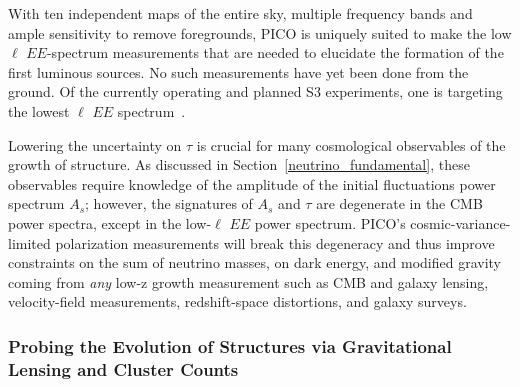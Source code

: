 \documentclass[PICOReport.tex]{subfiles}
\begin{document}
With ten independent maps of the entire sky, multiple frequency bands and ample sensitivity to remove foregrounds, PICO is uniquely suited to make the low $\ell$ $EE$-spectrum measurements that are needed to elucidate the formation of the first luminous sources. No such measurements have yet been done from the ground. Of the currently operating and planned S3 experiments, one is targeting the lowest $\ell$ $EE$ spectrum~\citep{class_overview}. 

Lowering the uncertainty on $\tau$ is crucial for many cosmological observables of the growth of structure. As discussed in Section~\ref{neutrino_fundamental}, these observables require knowledge of the amplitude of the initial fluctuations power spectrum $A_s$; however, the signatures of $A_{s}$ and $\tau$ are degenerate in the %
CMB power spectra, except in the low-$\ell$ $EE$ power spectrum.  PICO's cosmic-variance-limited polarization measurements will break this degeneracy and thus improve constraints on the sum of neutrino masses, on dark energy, and modified gravity coming from {\it any} low-z growth measurement such as CMB and galaxy lensing, velocity-field measurements, redshift-space distortions, and galaxy surveys. 

\subsubsection{Probing the Evolution of Structures via Gravitational Lensing and Cluster Counts} 
\label{sec:gravitationallensing}
\end{document}
